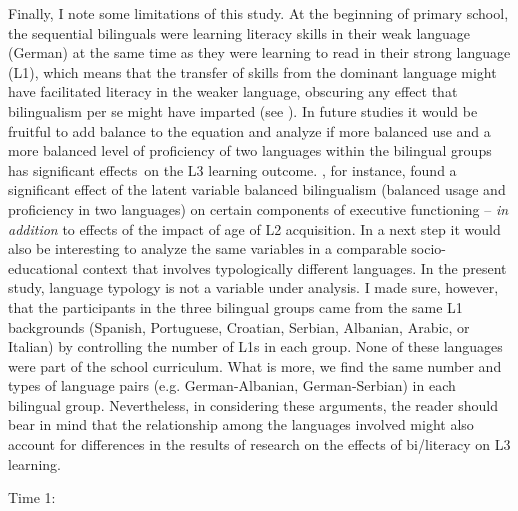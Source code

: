 \documentclass[output=paper,modfonts,nonflat,newtxmath]{langsci/langscibook}
\begin{document}
Finally, I note some limitations of this study. At the beginning of primary school, the sequential bilinguals were learning literacy skills in their weak language (German) at the same time as they were learning to read in their strong language (L1), which means that the transfer of skills from the dominant language might have facilitated literacy in the weaker language, obscuring any effect that bilingualism per se might have imparted (see \citealt{Bialystok2007}). In future studies it would be fruitful to add balance to the equation and analyze if more balanced use and a more balanced level of proficiency of two languages within the bilingual groups has significant effects~on the L3 learning outcome. \citet{YowLi2015}, for instance, found a significant effect of the latent variable balanced bilingualism (balanced usage and proficiency in two languages) on certain components of executive functioning – \textit{in} \textit{addition} to effects of the impact of age of L2 acquisition. In a next step it would also be interesting to analyze the same variables in a comparable socio-educational context that involves typologically different languages. In the present study, language typology is not a variable under analysis. I made sure, however, that the participants in the three bilingual groups came from the same L1 backgrounds (Spanish, Portuguese, Croatian, Serbian, Albanian, Arabic, or Italian) by controlling the number of L1s in each group. None of these languages were part of the school curriculum. What is more, we find the same number and types of language pairs (e.g. German-Albanian, German-Serbian) in each bilingual group. Nevertheless, in considering these arguments, the reader should bear in mind that the relationship among the languages involved might also account for differences in the results of research on the effects of bi/literacy on L3 learning.


Time 1:
\end{document}
